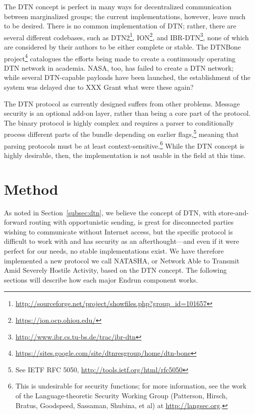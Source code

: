 \documentclass[12pt]{article}
\begin{document}
  The DTN concept is perfect in many ways for decentralized communication between marginalized groups; the current implementations, however, leave much to be desired. There is no common implementation of DTN; rather, there are several different codebases, such as DTN2\footnote{\url{http://sourceforge.net/project/showfiles.php?group_id=101657}}, ION\footnote{\url{https://ion.ocp.ohiou.edu/}}, and IBR-DTN\footnote{\url{http://www.ibr.cs.tu-bs.de/trac/ibr-dtn}}, none of which are considered by their authors to be either complete or stable. The DTNBone project\footnote{\url{https://sites.google.com/site/dtnresgroup/home/dtn-bone}} catalogues the efforts being made to create a continuously operating DTN network in academia. NASA, too, has failed to create a DTN network; while several DTN-capable payloads have been launched, the establishment of the system was delayed due to XXX Grant what were these again?
  
  The DTN protocol as currently designed suffers from other problems. Message security is an optional add-on layer, rather than being a core part of the protocol. The binary protocol is highly complex and requires a parser to conditionally process different parts of the bundle depending on earlier flags,\footnote{See IETF RFC 5050, \url{http://tools.ietf.org/html/rfc5050}} meaning that parsing protocols must be at least context-sensitive.\footnote{This is undesirable for security functions; for more information, see the work of the Language-theoretic Security Working Group (Patterson, Hirsch, Bratus, Goodspeed, Sassaman, Shubina, et al) at \url{http://langsec.org}.} While the DTN concept is highly desirable, then, the implementation is not usable in the field at this time.
  
  \section{Method}
  
  As noted in Section~\ref{subsec:dtn}, we believe the concept of DTN, with store-and-forward routing with opportunistic sending, is great for disconnected parties wishing to communicate without Internet access, but the specific protocol is difficult to work with and has security as an afterthought---and even if it were perfect for our needs, no stable implementations exist. We have therefore implemented a new protocol we call NATASHA, or Network Able to Transmit Amid Severely Hostile Activity, based on the DTN concept. The following sections will describe how each major Endrun component works.
  
\end{document}
